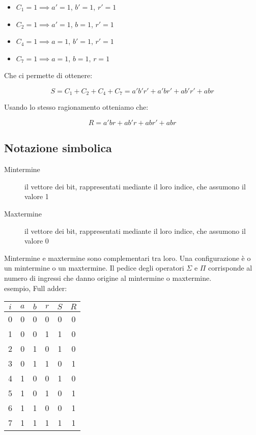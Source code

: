 \documentclass{subfiles}
\begin{document}
\begin{itemize}
\item $C_1 = 1 \implies a' = 1$, $b' = 1$, $r' = 1$
\item $C_2 = 1 \implies a' = 1$, $b = 1$, $r' = 1$
\item $C_4 = 1 \implies a = 1$, $b' = 1$, $r' = 1$
\item $C_7 = 1 \implies a = 1$, $b = 1$, $r = 1$
\end{itemize}

\noindent
Che ci permette di ottenere:

$$
S = C_1 + C_2 + C_4 + C_7 = a'b'r' + a'br' + ab'r' + abr
$$

\noindent
Usando lo stesso ragionamento otteniamo che:

$$
R = a'br + ab'r + abr' + abr
$$

\subsection{Notazione simbolica}

\begin{description}
	\item[Mintermine] il vettore dei bit, rappresentati mediante il loro indice, che assumono il valore 1
	\item[Maxtermine] il vettore dei bit, rappresentati mediante il loro indice, che assumono il valore 0
\end{description}

\noindent
Mintermine e maxtermine sono complementari tra loro.
Una configurazione è o un mintermine o un maxtermine.
Il pedice degli operatori $\Sigma$ e $\Pi$ corrisponde al numero di ingressi che danno origine al mintermine o maxtermine.\\

\noindent
esempio, Full adder:

\begin{center}
\begin{tabular}{ |c|c|c|c|c|c| }
\hline
$i$ & $a$ & $b$ & $r$ & $S$ & $R$ \\
\hline
\hline
0 & 0 & 0 & 0 & 0 & 0 \\
1 & 0 & 0 & 1 & 1 & 0 \\
2 & 0 & 1 & 0 & 1 & 0 \\
3 & 0 & 1 & 1 & 0 & 1 \\
4 & 1 & 0 & 0 & 1 & 0 \\
5 & 1 & 0 & 1 & 0 & 1 \\
6 & 1 & 1 & 0 & 0 & 1 \\
7 & 1 & 1 & 1 & 1 & 1 \\
\hline
\end{tabular}
\end{center}
\end{document}
